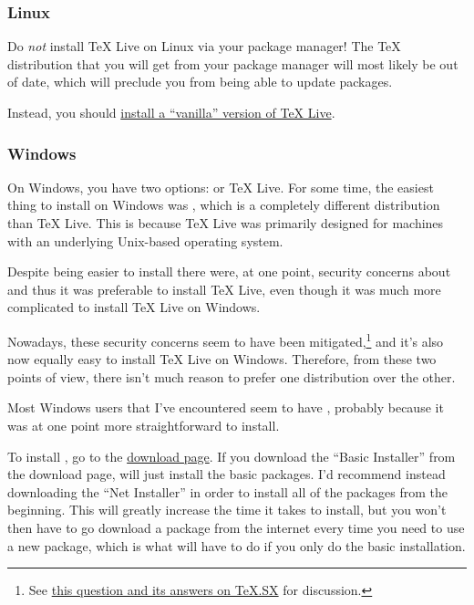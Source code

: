 \subsubsection{Linux}
\label{subsubsec:tex-distro:linux}

Do \emph{not} install TeX Live on Linux via your package manager!
The \TeX{} distribution that you will get from your package manager will most likely be out of date, which will preclude you from being able to update packages.

Instead, you should \href{http://tex.stackexchange.com/q/1092/32888}{install a ``vanilla'' version of TeX Live}.

\subsubsection{Windows}
\label{subsubsec:tex-distro:windows}

On Windows, you have two options:  or TeX Live.
For some time, the easiest thing to install on Windows was , which is a completely different distribution than TeX Live.
This is because TeX Live was primarily designed for machines with an underlying Unix-based operating system.

Despite  being easier to install there were, at one point, security concerns about  and thus it was preferable to install TeX Live, even though it was much more complicated to install TeX Live on Windows.

Nowadays, these security concerns seem to have been mitigated,\footnote{%
See \href{http://tex.stackexchange.com/q/20036/32888}{this question and its answers on TeX.SX} for discussion.%
} and it's also now equally easy to install TeX Live on Windows.
Therefore, from these two points of view, there isn't much reason to prefer one distribution over the other.

Most Windows users that I've encountered seem to have , probably because it was at one point more straightforward to install.

To install , go to the \href{https://miktex.org/download}{ download page}.
If you download the ``Basic Installer'' from the download page,  will just install the basic packages.
I'd recommend instead downloading the ``Net Installer'' in order to install all of the packages from the beginning.
This will greatly increase the time it takes to install, but you won't then have to go download a package from the internet every time you need to use a new package, which is what  will have to do if you only do the basic installation.

